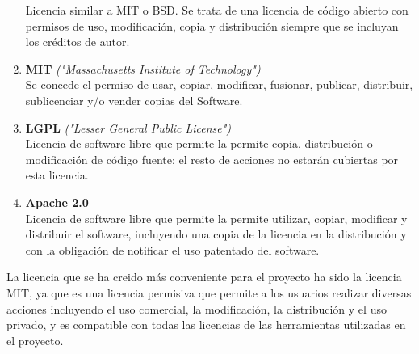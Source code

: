 \begin{enumerate}
    Licencia similar a MIT o BSD. Se trata de una licencia de código abierto con permisos de uso, modificación, copia y distribución siempre que se incluyan los créditos de autor.
    \item {\textbf{MIT } \textit{("Massachusetts Institute of Technology")}}\cite{MIT}\\
    Se concede el permiso de usar, copiar, modificar, fusionar, publicar, distribuir, sublicenciar y/o vender copias del Software.
    \item {\textbf{LGPL }\textit{("Lesser General Public License")}}\cite{LGPL}\\
    Licencia de software libre que permite la permite copia, distribución o modificación de código fuente; el resto de acciones no estarán cubiertas por esta licencia.
    \item {\textbf{Apache 2.0 }}\cite{Apache}\\
    Licencia de software libre que permite la permite  utilizar, copiar, modificar y distribuir el software, incluyendo una copia de la licencia en la distribución y con la obligación de notificar el uso patentado del software.
\end{enumerate}
La licencia que se ha creido más conveniente para el proyecto ha sido la licencia MIT, ya que es una licencia permisiva que permite a los usuarios realizar diversas acciones incluyendo el uso comercial, la modificación, la distribución y el uso privado, y es compatible con todas las licencias de las herramientas utilizadas en el proyecto.




